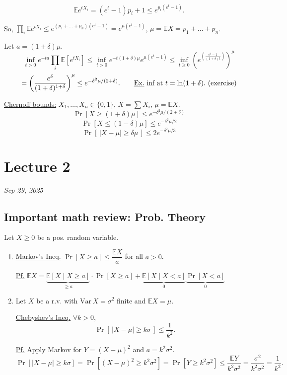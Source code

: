 \documentclass[11pt]{article}
\begin{document}
\[
\mathbb{E}e^{tX_i} = (e^t-1)p_i + 1 \leq e^{p_i(e^t-1)}.
\]

So, $\displaystyle\prod_i \mathbb{E}e^{tX_i} \leq e^{(p_1+\dots+p_n)(e^t-1)} = e^{\mu(e^t-1)}$, \quad $\mu = \mathbb{E}X = p_1+\dots+p_n$.

Let $a = (1+\delta)\mu$.
\[
\inf_{t>0} e^{-ta}\prod_i \mathbb{E}[e^{tX_i}] \leq \inf_{t>0} e^{-t(1+\delta)\mu} e^{\mu(e^t-1)} \leq \inf_{t\geq0}\left(e^{\left(\frac{e^t-1}{(1+\delta)t}\right)}\right)^\mu
\]
\[
= \left(\frac{e^\delta}{(1+\delta)^{1+\delta}}\right)^\mu \leq e^{-\delta^2\mu/(2+\delta)}. \qquad \text{\underline{Ex.} inf at } t=\ln(1+\delta). \text{ (exercise)}
\]

\underline{Chernoff bounds:} $X_1,\dots,X_n\in\{0,1\}$, $X=\sum X_i$, $\mu=\mathbb{E}X$.
\[
\Pr[X\geq(1+\delta)\mu] \leq e^{-\delta^2\mu/(2+\delta)}
\]
\[
\Pr[X\leq(1-\delta)\mu] \leq e^{-\delta^2\mu/2}
\]
\[
\Pr[\,|X-\mu|\geq\delta\mu\,] \leq 2e^{-\delta^2\mu/3}
\]

\section{Lecture 2}
\textit{Sep 29, 2025}

\subsection*{Important math review: Prob. Theory}

Let $X\geq 0$ be a pos. random variable.
\begin{enumerate}
\item[\textcircled{1}]
\underline{Markov's Ineq.} $\Pr[X\geq a] \leq \dfrac{\mathbb{E}X}{a}$ for all $a>0$.

\underline{Pf.} $\mathbb{E}X = \underbrace{\mathbb{E}[X\mid X\geq a]}_{\geq a}\cdot\Pr[X\geq a] + \underbrace{\mathbb{E}[X\mid X<a]}_{0}\underbrace{\Pr[X<a]}_{0}$
\end{enumerate}

\begin{enumerate}
\setcounter{enumi}{1}
\item[\textcircled{2}]
Let $X$ be a r.v. with $\mathrm{Var}\,X = \sigma^2$ finite and $\mathbb{E}X = \mu$.

\underline{Chebyshev's Ineq.} $\forall k>0$,
\[
\Pr[\,|X-\mu|\geq k\sigma\,] \leq \frac{1}{k^2}.
\]

\underline{Pf.} Apply Markov for $Y = (X-\mu)^2$ and $a = k^2\sigma^2$.
\[
\Pr[|X-\mu|\geq k\sigma] = \Pr[(X-\mu)^2 \geq k^2\sigma^2] = \Pr[Y\geq k^2\sigma^2] \leq \frac{\mathbb{E}Y}{k^2\sigma^2} = \frac{\sigma^2}{k^2\sigma^2} = \frac{1}{k^2}.
\]
\end{enumerate}
\end{document}
